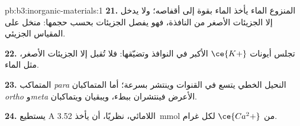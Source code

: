 \begin{solution}{pb:b3:inorganic-materials:1}
\textbf{21.}  المنزوع الماء يأخذ الماء بقوة إلى أقفاصه؛ ولا يدخل إلا
الجزيئات الأصغر من النافذة، فهو يفصل الجزيئات بحسب حجمها:
منخل على المقياس الجزيئي.

\textbf{22.} تجلس أيونات $\ce{K+}$ الأكبر في النوافذ وتضيّقها: فلا تُقبل إلا الجزيئات
الأصغر، مثل الماء.

\textbf{23.} المتماكب \textit{para} النحيل الخطي يتسع في القنوات وينتشر بسرعة؛ أما
المتماكبان \textit{ortho} و\textit{meta} الأعرض فينتشران ببطء، ويبقيان ويتماكبان.

\textbf{24.} يستطيع  A اللامائي، نظريًا، أن يأخذ \qty{3.52}{mmol} من $\ce{Ca^2+}$ لكل غرام.
\end{solution}
